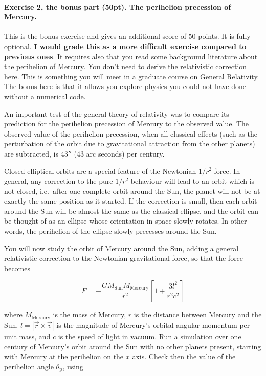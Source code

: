 \documentclass[%
oneside,                 %
final,                   %
10pt]{article}
\begin{document}
\noindent
\paragraph{Exercise 2, the bonus part (50pt).  The perihelion precession of Mercury.}
This is the bonus exercise and gives an additional score of 50
points. It is fully optional. \textbf{I would grade this as a more difficult
exercise compared to previous ones}. \href{{https://en.wikipedia.org/wiki/Tests_of_general_relativity}}{It requires also that you read
some background literature about the perihelion of Mercury}. You don't
need to derive the relativistic correction here. This is something you
will meet in a graduate course on General Relativity. The bonus here
is that it allows you explore physics you could not have done without
a numerical code.

An important test of the general theory of relativity was to compare
its prediction for the perihelion precession of Mercury to the
observed value. The observed value of the perihelion precession, when
all classical effects (such as the perturbation of the orbit due to
gravitational attraction from the other planets) are subtracted, is
$43''$ ($43$ arc seconds) per century.

Closed elliptical orbits are a special feature of the Newtonian
$1/r^2$ force. In general, any correction to the pure $1/r^2$
behaviour will lead to an orbit which is not closed, i.e.~after one
complete orbit around the Sun, the planet will not be at exactly the
same position as it started. If the correction is small, then each
orbit around the Sun will be almost the same as the classical ellipse,
and the orbit can be thought of as an ellipse whose orientation in
space slowly rotates. In other words, the perihelion of the ellipse
slowly precesses around the Sun.

You will now study the orbit of Mercury around the Sun, adding a general relativistic correction to the Newtonian
gravitational force, so that the force becomes

\[
F = -\frac{GM_\mathrm{Sun}M_\mathrm{Mercury}}{r^2}\left[1 + \frac{3l^2}{r^2c^2}\right]
\]

where $M_\mathrm{Mercury}$ is the mass of Mercury, $r$ is the distance
between Mercury and the Sun, $l=|\vec{r}\times\vec{v}|$ is the
magnitude of Mercury's orbital angular momentum per unit mass, and $c$
is the speed of light in vacuum. Run a simulation over one century of
Mercury's orbit around the Sun with no other planets present, starting
with Mercury at the perihelion on the $x$ axis.  Check then the value
of the perihelion angle $\theta_\mathrm{p}$, using
\end{document}
